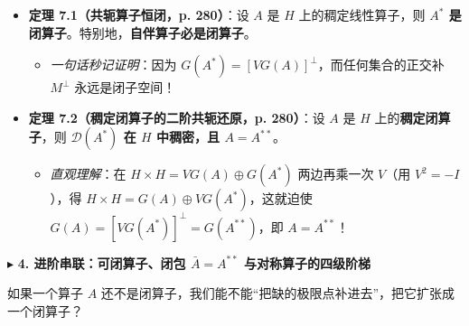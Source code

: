 \documentclass[11pt,a4paper]{article}
\providecommand{\tightlist}{\setlength{\itemsep}{2pt}\setlength{\parskip}{0pt}}
\newcommand{\SubSubHeading}[1]{%
  \Needspace{6.5\baselineskip}\vspace{5.5pt}\noindent
  \textcolor{AccentMain}{\scriptsize$\blacktriangleright$}\hspace{4pt}%
  {\small\bfseries\color{AccentMain}#1}\par\nopagebreak[4]\vspace{2.5pt}%
}
\begin{document}
\begin{itemize}
\tightlist
\item
  \textbf{定理 7.1（共轭算子恒闭，p. 280）}：设 \(A\) 是 \(H\) 上的稠定线性算子，则 \textbf{\(A^*\) 是闭算子}。特别地，\textbf{自伴算子必是闭算子}。

  \begin{itemize}
  \tightlist
  \item
    \emph{一句话秒记证明}：因为 \(G(A^*) = [VG(A)]^\perp\)，而任何集合的正交补 \(M^\perp\) 永远是闭子空间！
  \end{itemize}
\item
  \textbf{定理 7.2（稠定闭算子的二阶共轭还原，p. 280）}：设 \(A\) 是 \(H\) 上的\textbf{稠定闭算子}，则 \textbf{\(\mathcal{D}(A^*)\) 在 \(H\) 中稠密，且 \(A = A^{**}\)}。

  \begin{itemize}
  \tightlist
  \item
    \emph{直观理解}：在 \(H \times H = VG(A) \oplus G(A^*)\) 两边再乘一次 \(V\)（用 \(V^2 = -I\)），得 \(H \times H = G(A) \oplus VG(A^*)\)，这就迫使 \(G(A) = [VG(A^*)]^\perp = G(A^{**})\)，即 \(A = A^{**}\)！
  \end{itemize}
\end{itemize}

\SubSubHeading{4. 进阶串联：可闭算子、闭包 \(\bar{A} = A^{**}\) 与对称算子的四级阶梯}

如果一个算子 \(A\) 还不是闭算子，我们能不能``把缺的极限点补进去''，把它扩张成一个闭算子？
\end{document}
